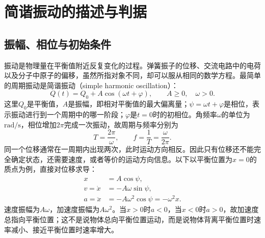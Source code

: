 \newcommand{\chTenWedgeProblemFigure}{\begin{chTenFigure}\begin{tikzpicture}[every node/.style=chTenLabel,>=Latex,scale=.8]
\draw[ground](-4.1,0)--(4.1,0);
\draw[thick](-3,0)--(-3,3)--(0,0)--cycle;\draw[thick](0,0)--(3,3)--(3,0)--cycle;
\fill[DeepBlue](-3,3)circle(3pt);\fill[DeepBlue](3,3)circle(3pt);\draw[thick,DeepBlue](-3,3)--(3,3);
\node[above]at(0,3.15){$L_0,\ k$};\node[above left]at(-3,3){$m$};\node[above right]at(3,3){$m$};
\node at(-2.1,.6){$m$};\node at(2.1,.6){$m$};
\draw(.85,0)arc(0:45:.85);\node at(1.25,.42){$45^\circ$};
\draw(-.85,0)arc(180:135:.85);\node at(-1.25,.42){$45^\circ$};
\end{tikzpicture}\figcap{两球在斜面顶端由静止释放，水平弹性轻杆初始处于自由长度。}\label{ch10:fig:wedges-problem}\end{chTenFigure}}

\section{简谐振动的描述与判据}\label{ch10:sec:shm}
\subsection{振幅、相位与初始条件}
振动是物理量在平衡值附近反复变化的过程。弹簧振子的位移、交流电路中的电荷以及分子中原子的偏移，虽然所指对象不同，却可以服从相同的数学方程。最简单的周期振动是简谐振动（simple harmonic oscillation）：
\begin{equation}\label{ch10:eq:definition}
 Q(t)=Q_0+A\cos(\omega t+\varphi),\qquad A\geq0,\quad\omega>0.
\end{equation}
这里$Q_0$是平衡值，$A$是振幅，即相对平衡值的最大偏离量；$\psi=\omega t+\varphi$是相位，表示振动进行到一个周期中的哪一阶段；$\varphi$是$t=0$时的初相位。角频率$\omega$的单位为$\mathrm{rad/s}$，相位增加$2\pi$完成一次振动，故周期与频率分别为
\[
 T=\frac{2\pi}{\omega},\qquad f=\frac1T=\frac{\omega}{2\pi}.
\]
同一个位移通常在一周期内出现两次，此时运动方向相反。因此只有位移还不能完全确定状态，还需要速度，或者等价的运动方向信息。以下以平衡位置为$x=0$的质点为例，直接对位移求导：
\begin{align}
 x&=A\cos\psi,\label{ch10:eq:shm-x}\\
 v=\dot x&=-A\omega\sin\psi,\label{ch10:eq:shm-v}\\
 a=\ddot x&=-A\omega^2\cos\psi=-\omega^2x.\label{ch10:eq:shm-a}
\end{align}
速度振幅为$A\omega$，加速度振幅为$A\omega^2$。当$x>0$时$a<0$，当$x<0$时$a>0$，故加速度总指向平衡位置；这不是说物体总向平衡位置运动，而是说物体背离平衡位置时速率减小、接近平衡位置时速率增大。

